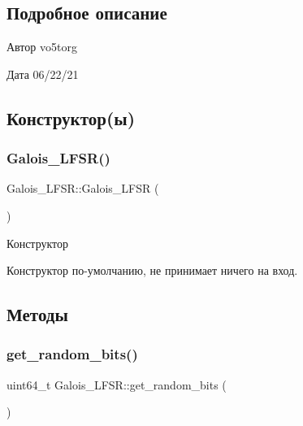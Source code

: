 \subsection{Подробное описание}
\begin{DoxyAuthor}{Автор}
vo5torg 
\end{DoxyAuthor}
\begin{DoxyDate}{Дата}
06/22/21 
\end{DoxyDate}


\subsection{Конструктор(ы)}
\mbox{\label{classGalois__LFSR_a23455fca80e4ed521062a7b2842edb03}} 
\subsubsection{\texorpdfstring{Galois\+\_\+\+L\+F\+S\+R()}{Galois\_LFSR()}}
{\footnotesize\ttfamily Galois\+\_\+\+L\+F\+S\+R\+::\+Galois\+\_\+\+L\+F\+SR (\begin{DoxyParamCaption}{ }\end{DoxyParamCaption})}



Конструктор 

Конструктор по-\/умолчанию, не принимает ничего на вход. 

\subsection{Методы}
\mbox{\label{classGalois__LFSR_abc5cfd0aa22803188a1f81a5959f22eb}} 
\subsubsection{\texorpdfstring{get\+\_\+random\+\_\+bits()}{get\_random\_bits()}}
{\footnotesize\ttfamily uint64\+\_\+t Galois\+\_\+\+L\+F\+S\+R\+::get\+\_\+random\+\_\+bits (\begin{DoxyParamCaption}{ }\end{DoxyParamCaption})}




